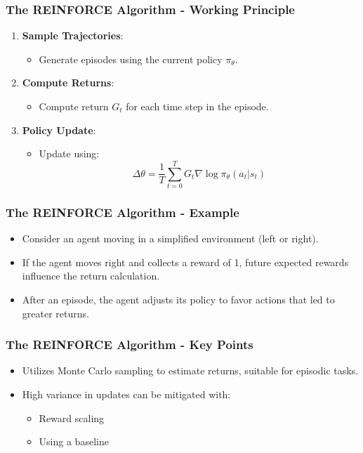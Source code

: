 \documentclass{beamer}
\begin{document}
\begin{frame}[fragile]
    \frametitle{The REINFORCE Algorithm - Working Principle}
    \begin{enumerate}
        \item \textbf{Sample Trajectories}:
        \begin{itemize}
            \item Generate episodes using the current policy \( \pi_\theta \).
        \end{itemize}
        
        \item \textbf{Compute Returns}:
        \begin{itemize}
            \item Compute return \( G_t \) for each time step in the episode.
        \end{itemize}

        \item \textbf{Policy Update}:
        \begin{itemize}
            \item Update using:
            \begin{equation}
            \Delta \theta = \frac{1}{T} \sum_{t=0}^{T} G_t \nabla \log \pi_\theta(a_t|s_t)
            \end{equation}
        \end{itemize}
    \end{enumerate}
\end{frame}

\begin{frame}[fragile]
    \frametitle{The REINFORCE Algorithm - Example}
    \begin{itemize}
        \item Consider an agent moving in a simplified environment (left or right).
        \item If the agent moves right and collects a reward of 1, future expected rewards influence the return calculation.
        \item After an episode, the agent adjusts its policy to favor actions that led to greater returns.
    \end{itemize}
\end{frame}

\begin{frame}[fragile]
    \frametitle{The REINFORCE Algorithm - Key Points}
    \begin{itemize}
        \item Utilizes Monte Carlo sampling to estimate returns, suitable for episodic tasks.
        \item High variance in updates can be mitigated with:
        \begin{itemize}
            \item Reward scaling
            \item Using a baseline
        \end{itemize}
    \end{itemize}
\end{frame}
\end{document}
